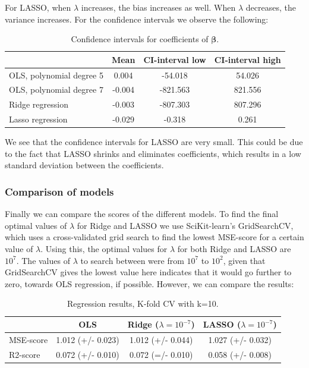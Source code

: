 \documentclass[12pt]{extarticle}
\begin{document}
For LASSO, when $\lambda$ increases, the bias increases as well. When $\lambda$ decreases, the variance increases. For the confidence intervals we observe the following:

\begin{table}
  \begin{center}
    \caption{Confidence intervals for coefficients of $\bm{\beta}$.}
    \label{tab:table7}
    \begin{tabular}{l|c|c|c} 
      \textbf{ } & \textbf{Mean} & \textbf{CI-interval low} & \textbf{CI-interval high}\\
      \hline
    OLS, polynomial degree 5 & 0.004 & -54.018 & 54.026\\
    OLS, polynomial degree 7 & -0.004 & -821.563 & 821.556\\
    Ridge regression & -0.003 & -807.303 & 807.296\\
    Lasso regression & -0.029 & -0.318 & 0.261
    \end{tabular}
  \end{center}
\end{table}


We see that the confidence intervals for LASSO are very small. This could be due to the fact that LASSO shrinks and eliminates coefficients, which results in a low standard deviation between the coefficients.

\subsubsection{Comparison of models}

Finally we can compare the scores of the different models. To find the final optimal values of $\lambda$ for Ridge and LASSO we use SciKit-learn’s GridSearchCV, which uses a cross-validated grid search to find the lowest MSE-score for a certain value of $\lambda$. Using this, the optimal values for $\lambda$ for both Ridge and LASSO are $10^{7}$. The values of $\lambda$ to search between were from $10^{7}$ to $10^{2}$, given that GridSearchCV gives the lowest value here indicates that it would go further to zero, towards OLS regression, if possible. However, we can compare the results:

\begin{table}
  \begin{center}
    \caption{Regression results, K-fold CV with k=10.}
    \label{tab:table8}
    \begin{tabular}{l|c|c|c} 
      & \textbf{OLS} & \textbf{Ridge} ($\lambda = 10^{-7}$) & \textbf{LASSO} ($\lambda = 10^{-7}$)\\
      \hline
      MSE-score & 1.012 (+/- 0.023) & 1.012 (+/- 0.044) & 1.027 (+/- 0.032)\\
    R2-score & 0.072 (+/- 0.010) & 0.072 (=/- 0.010) & 0.058 (+/- 0.008)\\
    \end{tabular}
  \end{center}
\end{table}
\end{document}
